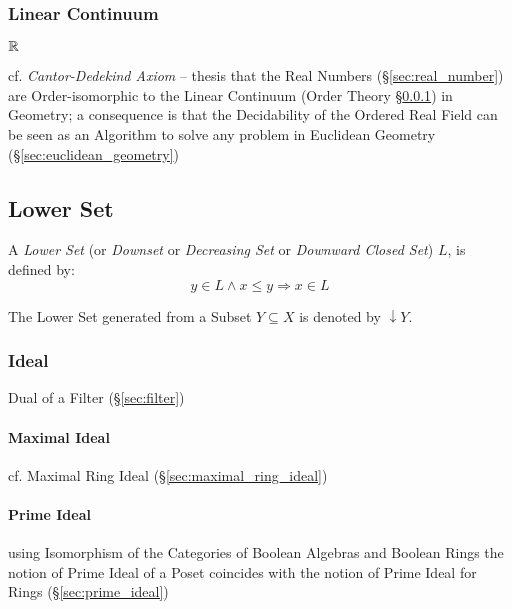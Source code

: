 \subsubsection{Linear Continuum}\label{sec:linear_continuum}

$\mathbb{R}$

cf. \emph{Cantor-Dedekind Axiom} -- thesis that the Real Numbers
(\S\ref{sec:real_number}) are Order-isomorphic to the Linear Continuum (Order
Theory \S\ref{sec:linear_continuum}) in Geometry; a consequence is that the
Decidability of the Ordered Real Field can be seen as an Algorithm to solve any
problem in Euclidean Geometry (\S\ref{sec:euclidean_geometry})



\subsection{Lower Set}\label{sec:lower_set}

A \emph{Lower Set} (or \emph{Downset} or \emph{Decreasing Set} or
\emph{Downward Closed Set}) $L$, is defined by:
\[
  y \in L \wedge x \leq y \Rightarrow x \in L
\]

The Lower Set generated from a Subset $Y \subseteq X$ is denoted by
$\downarrow Y$.



\subsubsection{Ideal}\label{sec:order_ideal}

Dual of a Filter (\S\ref{sec:filter})



\paragraph{Maximal Ideal}\label{sec:maximal_ideal}\hfill

cf. Maximal Ring Ideal (\S\ref{sec:maximal_ring_ideal})



\paragraph{Prime Ideal}\label{sec:order_prime_ideal}\hfill

\fist using Isomorphism of the Categories of Boolean Algebras and Boolean Rings
the notion of Prime Ideal of a Poset coincides with the notion of Prime Ideal
for Rings (\S\ref{sec:prime_ideal})



